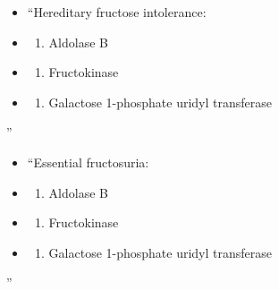 \documentclass[
]{book}
\providecommand{\tightlist}{%
  \setlength{\itemsep}{0pt}\setlength{\parskip}{0pt}}
\begin{document}
\begin{itemize}
\item
  ``Hereditary fructose intolerance:
\item
  \begin{enumerate}
  \def\labelenumi{(\Alph{enumi})}
  \tightlist
  \item
    Aldolase B\\
  \end{enumerate}
\item
  \begin{enumerate}
  \def\labelenumi{(\Alph{enumi})}
  \setcounter{enumi}{1}
  \tightlist
  \item
    Fructokinase\\
  \end{enumerate}
\item
  \begin{enumerate}
  \def\labelenumi{(\Alph{enumi})}
  \setcounter{enumi}{2}
  \tightlist
  \item
    Galactose 1-phosphate uridyl transferase
  \end{enumerate}
\end{itemize}

''

\begin{itemize}
\item
  ``Essential fructosuria:
\item
  \begin{enumerate}
  \def\labelenumi{(\Alph{enumi})}
  \tightlist
  \item
    Aldolase B\\
  \end{enumerate}
\item
  \begin{enumerate}
  \def\labelenumi{(\Alph{enumi})}
  \setcounter{enumi}{1}
  \tightlist
  \item
    Fructokinase\\
  \end{enumerate}
\item
  \begin{enumerate}
  \def\labelenumi{(\Alph{enumi})}
  \setcounter{enumi}{2}
  \tightlist
  \item
    Galactose 1-phosphate uridyl transferase
  \end{enumerate}
\end{itemize}

''
\end{document}
